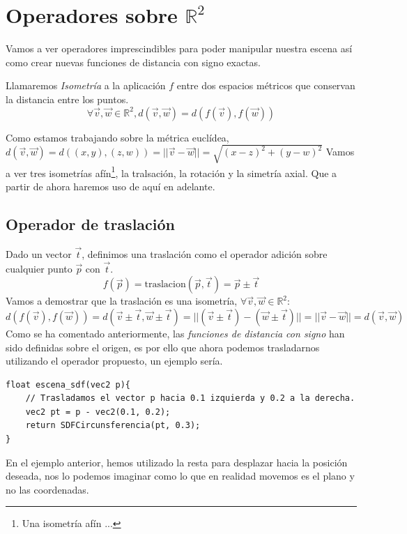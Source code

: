 \newpage

\section{Operadores sobre \(\mathbb{R}^2\)}
Vamos a ver operadores imprescindibles para poder manipular nuestra escena así como crear nuevas funciones de distancia con signo exactas.

\begin{definition}
Llamaremos \textit{Isometría} a la aplicación \(f\) entre dos espacios métricos que conservan la distancia entre los puntos. \[\forall \Vec{v},\Vec{w} \in\mathbb{R}^2, d(\Vec{v},\Vec{w})=d(f(\Vec{v}),f(\Vec{w}))\]
\end{definition}

Como estamos trabajando sobre la métrica euclídea, \(d(\Vec{v},\Vec{w})=d((x,y),(z,w))=\vert\vert \Vec{v}-\Vec{w}\vert\vert=\sqrt{(x-z)^2+(y-w)^2}\) 
Vamos a ver tres isometrías afín\footnote{Una isometría afín ...}, la tralsación, la rotación y la simetría axial. Que a partir de ahora haremos uso de aquí en adelante.

\subsection{Operador de traslación}
Dado un vector \(\Vec{t}\), definimos una traslación como el operador adición  sobre cualquier punto \(\Vec{p}\) con \(\Vec{t}\).
\[f(\Vec{p})=\text{traslacion}(\Vec{p},\Vec{t})=\Vec{p}\pm\Vec{t}\]
Vamos a demostrar que la traslación es una isometría, \(\forall \Vec{v},\Vec{w}\in\mathbb{R}^2\):
\[d(f(\Vec{v}), f(\Vec{w}))=d(\Vec{v}\pm\Vec{t}, \Vec{w}\pm\Vec{t})=\vert\vert (\Vec{v}\pm\Vec{t})-(\Vec{w}\pm\Vec{t})\vert\vert=\vert\vert \Vec{v}-\Vec{w}\vert\vert=d(\Vec{v}, \Vec{w})\]
Como se ha comentado anteriormente, las \textit{funciones de distancia con signo} han sido definidas sobre el origen, es por ello que ahora podemos trasladarnos utilizando el operador propuesto, un ejemplo sería.
\begin{lstlisting}
float escena_sdf(vec2 p){
    // Trasladamos el vector p hacia 0.1 izquierda y 0.2 a la derecha.
    vec2 pt = p - vec2(0.1, 0.2);
    return SDFCircunsferencia(pt, 0.3);
}
\end{lstlisting}

En el ejemplo anterior, hemos utilizado la resta para desplazar hacia la posición deseada, nos lo podemos imaginar como lo que en realidad movemos es el plano y no las coordenadas.

